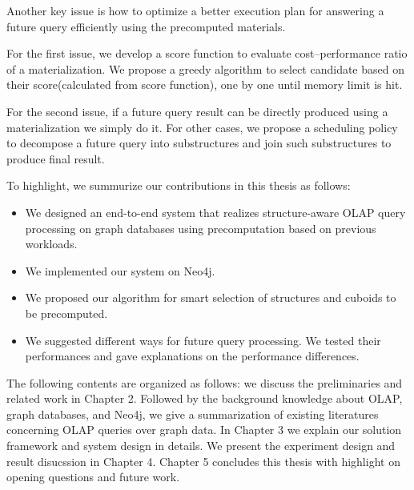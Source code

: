 Another key issue is how to optimize a better execution plan for answering a future query efficiently using the precomputed materials.


For the first issue, we develop a score function to evaluate cost–performance ratio of a materialization. We propose a greedy  algorithm to  select candidate  based on their score(calculated from score function), one by one until memory limit is hit.

For the second issue, if a future query result can be directly produced using a materialization we simply do it. For other cases, we propose a scheduling policy to decompose a future query into substructures and join such substructures to produce final result.  

To highlight, we summurize our contributions in this thesis as follows:
\begin{itemize}
\item {We designed an end-to-end system that realizes structure-aware OLAP query processing on graph databases using precomputation based on previous workloads.}

\item We implemented our system on Neo4j.

\item We proposed our algorithm for smart selection of structures and cuboids to be precomputed.
 
\item We suggested different ways for future query processing. We tested their performances and gave explanations on the performance differences.
 
 \end{itemize}

The following contents are organized as follows:
 we discuss the preliminaries and related work in Chapter 2. Followed by the background knowledge about  OLAP, graph databases, and Neo4j, we give a summarization of existing literatures concerning OLAP queries over graph data. In Chapter 3 we explain our solution framework and system design in details. We present the experiment design and result disucssion in Chapter 4. Chapter 5 concludes this thesis with highlight on opening questions and future work.

